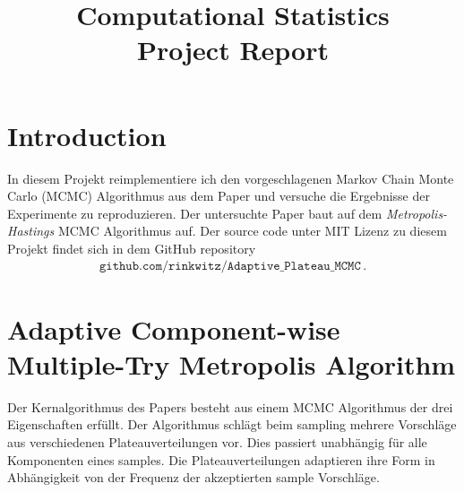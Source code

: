 \documentclass{scrartcl}
\title{Computational Statistics\\Project Report}
\begin{document}
    \maketitle


    \section{Introduction}
    In diesem Projekt reimplementiere ich den vorgeschlagenen Markov Chain Monte Carlo (MCMC) Algorithmus aus dem Paper
    \cite{lau2019} und versuche die Ergebnisse der Experimente zu reproduzieren. Der untersuchte Paper baut auf dem
    \textit{Metropolis-Hastings} MCMC Algorithmus \cite{metropolis1953} auf. \cite{liu2000}
    Der source code unter MIT Lizenz zu diesem Projekt findet sich in dem GitHub repository
    \begin{align*}
        \texttt{github.com/rinkwitz/Adaptive\_Plateau\_MCMC}\,.
    \end{align*}


    \section{Adaptive Component-wise Multiple-Try Metropolis Algorithm} Der Kernalgorithmus
    des Papers \cite{lau2019} besteht aus einem MCMC Algorithmus der drei Eigenschaften erfüllt. Der Algorithmus schlägt
    beim sampling mehrere Vorschläge aus verschiedenen Plateauverteilungen vor. Dies passiert unabhängig für alle
    Komponenten eines samples. Die Plateauverteilungen adaptieren ihre Form in Abhängigkeit von der Frequenz der akzeptierten sample Vorschläge.
\end{document}
